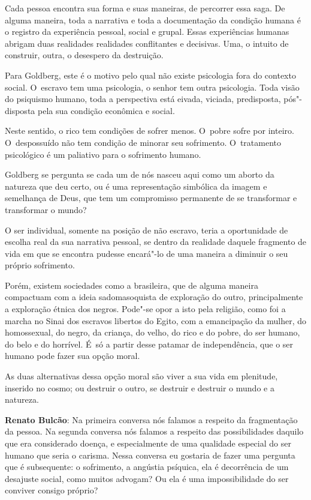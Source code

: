 Cada pessoa encontra sua forma e suas maneiras, de percorrer essa saga.
De alguma maneira, toda a narrativa e toda a documentação da condição
humana é o registro da experiência pessoal, social e grupal. Essas
experiências humanas abrigam duas realidades realidades conflitantes e
decisivas. Uma, o intuito de construir, outra, o desespero da
destruição.

Para Goldberg, este é o motivo pelo qual não existe psicologia fora do
contexto social. O~escravo tem uma psicologia, o senhor tem outra
psicologia. Toda visão do psiquismo humano, toda a perspectiva está
eivada, viciada, predisposta, pós"-disposta pela sua condição econômica e
social.

Neste sentido, o rico tem condições de sofrer menos. O~pobre sofre por
inteiro. O~despossuído não tem condição de minorar seu sofrimento. O~tratamento psicológico é um paliativo para o sofrimento humano.

Goldberg se pergunta se cada um de nós nasceu aqui como um aborto da
natureza que deu certo, ou é uma representação simbólica da imagem e
semelhança de Deus, que tem um compromisso permanente de se transformar
e transformar o mundo?

O ser individual, somente na posição de não escravo, teria a
oportunidade de escolha real da sua narrativa pessoal, se dentro da
realidade daquele fragmento de vida em que se encontra pudesse
encará"-lo de uma maneira a diminuir o seu próprio sofrimento.

Porém, existem sociedades como a brasileira, que de alguma maneira
compactuam com a ideia sadomasoquista de exploração do outro,
principalmente a exploração étnica dos negros. Pode"-se opor a isto pela
religião, como foi a marcha no Sinai dos escravos libertos do Egito, com
a emancipação da mulher, do homossexual, do negro, da criança, do velho,
do rico e do pobre, do ser humano, do belo e do horrível. É~só a partir
desse patamar de independência, que o ser humano pode fazer sua opção
moral.

As duas alternativas dessa opção moral são viver a sua vida em
plenitude, inserido no cosmo; ou destruir o outro, se destruir e
destruir o mundo e a natureza.

\begin{center}\asterisc{}\end{center}

\abrefala
 

\textbf{Renato Bulcão}: Na primeira conversa nós falamos a respeito da
fragmentação da pessoa. Na segunda conversa nós falamos a respeito das
possibilidades daquilo que era considerado doença, e especialmente de
uma qualidade especial do ser humano que seria o carisma. Nessa conversa
eu gostaria de fazer uma pergunta que é subsequente: o sofrimento, a
angústia psíquica, ela é decorrência de um desajuste social, como muitos
advogam? Ou ela é uma impossibilidade do ser
conviver consigo próprio?

